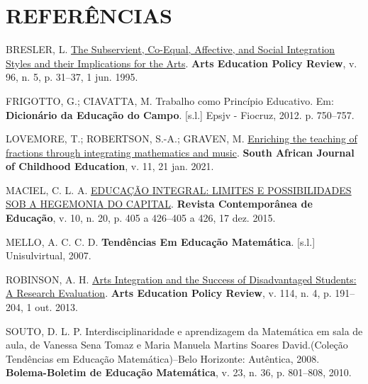 \documentclass[
  letterpaper,
  DIV=11,
  numbers=noendperiod]{scrreprt}
\newlength{\cslhangindent}
\newenvironment{CSLReferences}[2] %
 {\begin{list}{}{%
  \setlength{\itemindent}{0pt}
  \setlength{\leftmargin}{0pt}
  \setlength{\parsep}{0pt}
  \ifodd #1
   \setlength{\leftmargin}{\cslhangindent}
   \setlength{\itemindent}{-1\cslhangindent}
  \fi
  \setlength{\itemsep}{#2\baselineskip}}}
 {\end{list}}
\begin{document}
\chapter*{REFERÊNCIAS}\label{referuxeancias}

\label{refs}
\begin{CSLReferences}{0}{1}
BRESLER, L. \href{https://doi.org/10.1080/10632913.1995.9934564}{The
Subservient, Co-Equal, Affective, and Social Integration Styles and
their Implications for the Arts}. \textbf{Arts Education Policy Review},
v. 96, n. 5, p. 31--37, 1 jun. 1995.

FRIGOTTO, G.; CIAVATTA, M. Trabalho como Princípio Educativo. Em:
\textbf{Dicionário da Educação do Campo}. {[}s.l.{]} Epsjv - Fiocruz,
2012. p. 750--757.

LOVEMORE, T.; ROBERTSON, S.-A.; GRAVEN, M.
\href{https://doi.org/10.4102/sajce.v11i1.899}{Enriching the teaching of
fractions through integrating mathematics and music}. \textbf{South
African Journal of Childhood Education}, v. 11, 21 jan. 2021.

MACIEL, C. L. A.
\href{https://doi.org/10.20500/rce.v10i20.2220}{{EDUCAÇÃO} {INTEGRAL}:
{LIMITES} E {POSSIBILIDADES} {SOB} A {HEGEMONIA} {DO} {CAPITAL}}.
\textbf{Revista Contemporânea de Educação}, v. 10, n. 20, p. 405 a
426--405 a 426, 17 dez. 2015.

MELLO, A. C. C. D. \textbf{Tendências Em Educação Matemática}.
{[}s.l.{]} Unisulvirtual, 2007.

ROBINSON, A. H. \href{https://doi.org/10.1080/10632913.2013.826050}{Arts
Integration and the Success of Disadvantaged Students: A Research
Evaluation}. \textbf{Arts Education Policy Review}, v. 114, n. 4, p.
191--204, 1 out. 2013.

SOUTO, D. L. P. Interdisciplinaridade e aprendizagem da Matemática em
sala de aula, de Vanessa Sena Tomaz e Maria Manuela Martins Soares
David.(Coleção Tendências em Educação Matemática)--Belo Horizonte:
Autêntica, 2008. \textbf{Bolema-Boletim de Educação Matemática}, v. 23,
n. 36, p. 801--808, 2010.

\end{CSLReferences}
\end{document}
